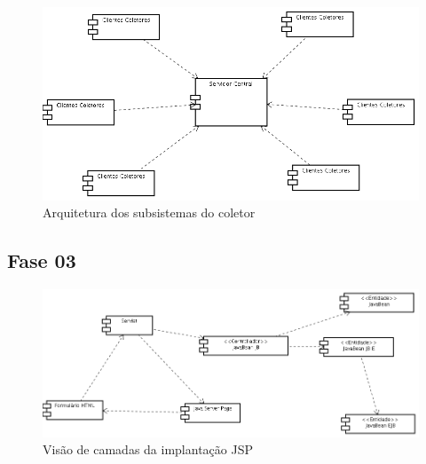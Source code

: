 \begin{figure}[hb]
    \begin{center}
        \includegraphics[scale=0.5]{img/coletor}
        \caption{Arquitetura dos subsistemas do coletor}
        \label{fig:arquitetura-coletor}
    \end{center}
\end{figure}

\subsection{Fase 03}

\begin{figure}[hb]
    \begin{center}
        \includegraphics[scale=0.5]{img/jsp}
        \caption{Visão de camadas da implantação JSP}
        \label{fig:}
    \end{center}
\end{figure}

